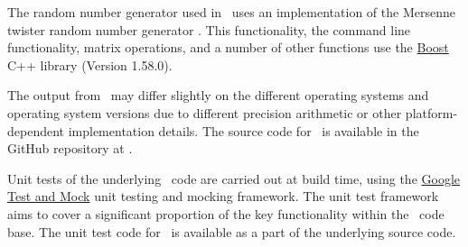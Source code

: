 The random number generator used in \CNAME\ uses an implementation of the Mersenne twister random number generator \citep{796}. This functionality, the command line functionality, matrix operations, and a number of other functions use the \href{http://www.boost.org/}{Boost} C++ library (Version 1.58.0).

The output from \CNAME\ may differ slightly on the different operating systems and operating system versions due to different precision arithmetic or other platform-dependent implementation details. The source code for \CNAME\ is available in the GitHub repository at \github.

Unit tests of the underlying \CNAME\ code are carried out at build time, using the \href{https://github.com/google/googletest}{Google Test and Mock} unit testing and mocking framework. The unit test framework aims to cover a significant proportion of the key functionality within the \CNAME\ code base. The unit test code for \CNAME\ is available as a part of the underlying source code.

